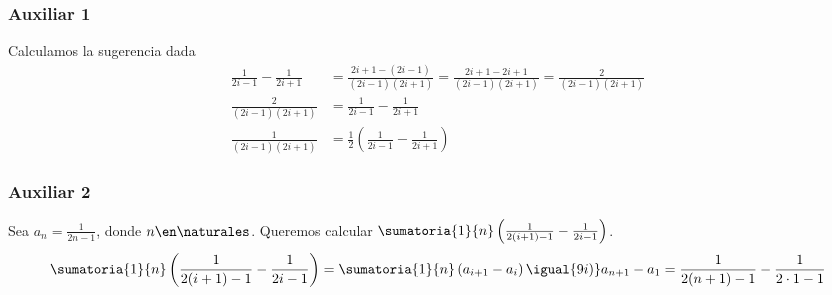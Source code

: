 \begin{enumerate}[label=\roman*)]
        \subsubsection*{Auxiliar 1}
        Calculamos la sugerencia dada
        \begin{align*}
          \frac{1}{2i-1} - \frac{1}{2i+1} & = \frac{2i+1 - (2i-1)}{(2i-1)(2i+1)} = \frac{2i+1 - 2i+1}{(2i-1)(2i+1)}= \frac{2}{(2i-1)(2i+1)} \\
          \frac{2}{(2i-1)(2i+1)}          & = \frac{1}{2i-1} - \frac{1}{2i+1}                                                               \\
          \frac{1}{(2i-1)(2i+1)}          & = \frac{1}{2} \left( \frac{1}{2i-1} - \frac{1}{2i+1} \right)
        \end{align*}

        \subsubsection*{Auxiliar 2}
        Sea $ a_n = \frac{1}{2n-1}$, donde $n \en \naturales $. Queremos calcular $ \sumatoria{1}{n} \left(\frac{1}{2(i+1)-1} - \frac{1}{2i-1}\right)$.
        \begin{align*}
          \sumatoria{1}{n} \left( \frac{1}{2(i+1)-1} - \frac{1}{2i-1}\right) =
          \sumatoria{1}{n} \left(a_{i+1}- a_i \right) \igual{9i)}
          a_{n+1} - a_1 =
          \frac{1}{2(n+1)-1} - \frac{1}{2\cdot 1-1}
        \end{align*}
\end{enumerate}

\begin{aportes}
  \item {}
\end{aportes}
